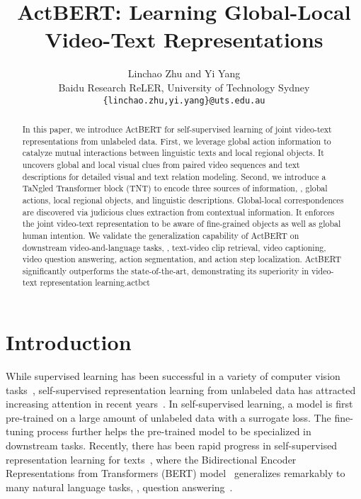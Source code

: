 \documentclass[10pt,twocolumn,letterpaper]{article}
\newcommand{\ours}{ActBERT\xspace}
\begin{document}
\title{\ours: Learning Global-Local Video-Text Representations}



\renewcommand{\thefootnote}{*}
\author{Linchao Zhu and Yi Yang \\
 Baidu Research  ReLER, University of Technology Sydney \\
{\tt\small \{linchao.zhu,yi.yang\}@uts.edu.au}
}

\maketitle
\thispagestyle{empty}



\begin{abstract}

In this paper, we introduce \ours for self-supervised learning of joint video-text representations from unlabeled data. First, we leverage global action information to catalyze mutual interactions between linguistic texts and local regional objects. It uncovers global and local visual clues from paired video sequences and text descriptions for detailed visual and text relation modeling. 
Second, we introduce a TaNgled Transformer block (TNT) to encode three sources of information, \ie, global actions, local regional objects, and linguistic descriptions.
Global-local correspondences are discovered via  judicious  clues extraction from  contextual information. It enforces the joint video-text representation to be aware of fine-grained objects as well as global human intention.
We validate the generalization capability of \ours on downstream video-and-language tasks, \ie, text-video clip retrieval, video captioning, video question answering, action segmentation, and action step localization.
\ours significantly outperforms the state-of-the-art, demonstrating its superiority in video-text representation learning.actbct

\end{abstract}

\section{Introduction}
While supervised learning has been successful in a variety of computer vision tasks~\cite{krizhevsky2012imagenet,he2016deep,c3d,ren2015faster}, self-supervised representation learning from unlabeled data has attracted increasing attention in recent years~\cite{caron2018deep,misra2016shuffle}.
In self-supervised learning, a model is first pre-trained on a large amount of unlabeled data with a surrogate loss.
The fine-tuning process further helps the pre-trained model to be specialized in downstream tasks.
Recently, there has been rapid progress in self-supervised representation learning for texts~\cite{devlin2018bert,yang2019xlnet}, where the Bidirectional Encoder Representations from Transformers (BERT) model~\cite{devlin2018bert} generalizes remarkably to many natural language tasks, \eg, question answering~\cite{alberti2019bert}.
\end{document}
